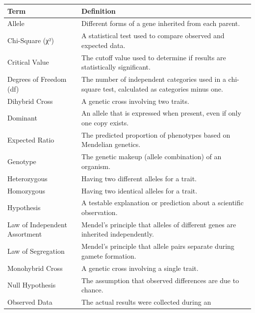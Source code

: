 \documentclass[
  letterpaper,
  DIV=11,
  numbers=noendperiod]{scrreprt}
\newcounter{none} %
\begin{document}
{\def\LTcaptype{none} %
\begin{longtable}[]{@{}
  >{\raggedright\arraybackslash}p{}
  >{\raggedright\arraybackslash}p{}@{}}
\toprule\noalign{}
\begin{minipage}[b]{\linewidth}\raggedright
\textbf{Term}
\end{minipage} & \begin{minipage}[b]{\linewidth}\raggedright
\textbf{Definition}
\end{minipage} \\
\midrule\noalign{}
\endhead
\bottomrule\noalign{}
\endlastfoot
Allele & Different forms of a gene inherited from each parent. \\
Chi-Square (χ²) & A statistical test used to compare observed and
expected data. \\
Critical Value & The cutoff value used to determine if results are
statistically significant. \\
Degrees of Freedom (df) & The number of independent categories used in a
chi-square test, calculated as categories minus one. \\
Dihybrid Cross & A genetic cross involving two traits. \\
Dominant & An allele that is expressed when present, even if only one
copy exists. \\
Expected Ratio & The predicted proportion of phenotypes based on
Mendelian genetics. \\
Genotype & The genetic makeup (allele combination) of an organism. \\
Heterozygous & Having two different alleles for a trait. \\
Homozygous & Having two identical alleles for a trait. \\
Hypothesis & A testable explanation or prediction about a scientific
observation. \\
Law of Independent Assortment & Mendel's principle that alleles of
different genes are inherited independently. \\
Law of Segregation & Mendel's principle that allele pairs separate
during gamete formation. \\
Monohybrid Cross & A genetic cross involving a single trait. \\
Null Hypothesis & The assumption that observed differences are due to
chance. \\
Observed Data & The actual results were collected during an

\end{longtable}}
\end{document}
